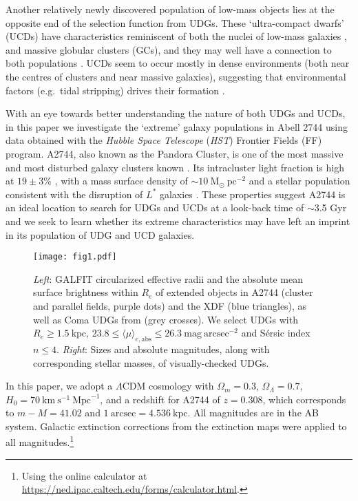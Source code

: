 \documentclass[iop,tighten,twocolumn,apj]{emulateapj}
\begin{document}
Another relatively newly discovered population of low-mass objects lies at the
opposite end of the selection function from UDGs. These `ultra-compact dwarfs'
(UCDs) have characteristics reminiscent of both the nuclei of low-mass
galaxies \citep{georgiev2014}, and massive globular clusters (GCs), and they
may well have a connection to both populations \citep[see,
e.g.,][]{mieske2002,mieske2012,brodie2011,norris2014,zhang2015}. UCDs seem to
occur mostly in dense environments (both near the centres of clusters and near
massive galaxies), suggesting that environmental factors (e.g.\ tidal
stripping) drives their formation \citep[e.g.,][]{bekki2003,pfeffer2013}.

With an eye towards better understanding the nature of both UDGs and UCDs, in
this paper we investigate the `extreme' galaxy populations in Abell 2744 using
data obtained with the {\em Hubble Space Telescope} (\textit{HST}) Frontier
Fields (FF) program. A2744, also known as the Pandora Cluster, is one of the
most massive \citep[virial mass $\sim 5 \times
10^{15}~\mathrm{M}_{\odot}$,][]{boschin2006,medezinski2016} and most disturbed
galaxy clusters known \citep{owers2011}.
Its intracluster light fraction is high at $19 \pm 3\%$
\citep{jimenezteja2016}, with a mass surface density of $\sim
10~\mathrm{M}_{\odot}~\mathrm{pc}^{-2}$ and a stellar population consistent
with the disruption of $L^\ast$ galaxies \citep{montes2014}. These properties
suggest A2744 is an ideal location to search for UDGs and UCDs at a look-back
time of $\sim$3.5 Gyr and we seek to learn whether its extreme characteristics
may have left an imprint in its population of UDG and UCD galaxies.

\begin{figure*}
	\texttt{[image: fig1.pdf]}
	\caption{
	\textit{Left}: GALFIT circularized effective radii and the absolute
	mean surface brightness within $R_e$ of extended objects in A2744
	(cluster and parallel fields, purple dots) and the XDF (blue
	triangles), as well as Coma UDGs from \cite{yagi2016} (grey crosses).
	We select UDGs with $R_e \geq 1.5~\mathrm{kpc}$,
	$23.8 \leq \langle\mu\rangle_{e,\mathrm{abs}} \leq
	26.3~\mathrm{mag}~\mathrm{arcsec}^{-2}$ and S\'ersic index $n \leq 4$. 
	\textit{Right}: Sizes and absolute magnitudes, along with
	corresponding stellar masses, of visually-checked UDGs.
	\label{fig:galfit}
	}
\end{figure*}

In this paper, we adopt a $\Lambda$CDM cosmology with $\Omega_m = 0.3$,
$\Omega_{\Lambda} = 0.7$, $H_0 =
70~\mathrm{km}~\mathrm{s}^{-1}~\mathrm{Mpc}^{-1}$, and a redshift for A2744 of
$z = 0.308$, which corresponds to $m-M = 41.02$ and $1~\mathrm{arcsec} =
4.536~\mathrm{kpc}$.  All magnitudes are in the AB system. Galactic extinction
corrections from the \cite{schlafly2011} extinction maps were applied to all
magnitudes.\footnote{Using the online calculator at
\url{https://ned.ipac.caltech.edu/forms/calculator.html}.}
\end{document}
